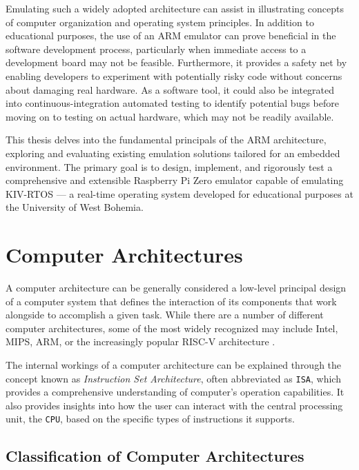 \documentclass[english, ing, kiv, he, iso690numb, pdf]{fasthesis}
\begin{document}
	Emulating such a widely adopted architecture can assist in illustrating concepts of computer organization and operating system principles. In addition to educational purposes, the use of an ARM emulator can prove beneficial in the software development process, particularly when immediate access to a development board may not be feasible. Furthermore, it provides a safety net by enabling developers to experiment with potentially risky code without concerns about damaging real hardware. As a software tool, it could also be integrated into continuous-integration automated testing to identify potential bugs before moving on to testing on actual hardware, which may not be readily available.
	
	This thesis delves into the fundamental principals of the ARM architecture, exploring and evaluating existing emulation solutions tailored for an embedded environment. The primary goal is to design, implement, and rigorously test a comprehensive and extensible Raspberry Pi Zero emulator capable of emulating KIV-RTOS \cite{KIV-RTOS} — a real-time operating system developed for educational purposes at the University of West Bohemia.
	
	\chapter{Computer Architectures}
	
	A computer architecture can be generally considered a low-level principal design of a computer system that defines the interaction of its components that work alongside to accomplish a given task. While there are a number of different computer architectures, some of the most widely recognized may include Intel, MIPS, ARM, or the increasingly popular RISC-V architecture \cite{harvard-architecture-1}.
	
	The internal workings of a computer architecture can be explained through the concept known as \textit{Instruction Set Architecture}, often abbreviated as \texttt{ISA}, which provides a comprehensive understanding of computer's operation capabilities. It also provides insights into how the user can interact with the central processing unit, the \texttt{CPU}, based on the specific types of instructions it supports. 
	
	\section{Classification of Computer Architectures} \label{Classification of Computer Architectures}
	
\end{document}
